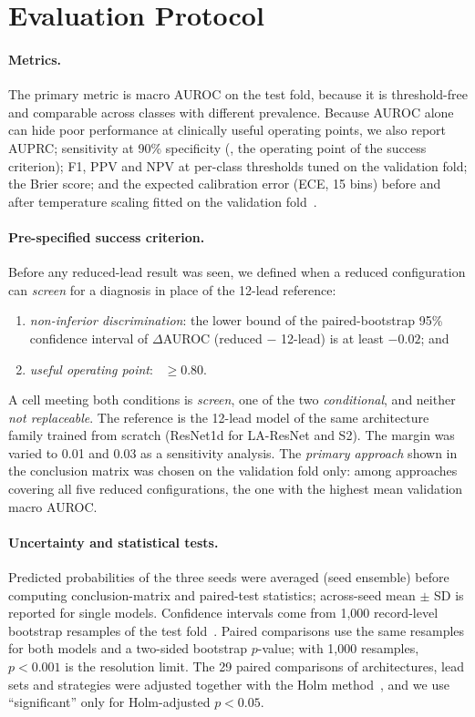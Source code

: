\section{Evaluation Protocol}
\label{sec:eval}

\paragraph{Metrics.} The primary metric is macro AUROC on the test fold, because it is threshold-free and comparable across classes with different prevalence. Because AUROC alone can hide poor performance at clinically useful operating points, we also report AUPRC; sensitivity at 90\% specificity (\sensninety, the operating point of the success criterion); F1, PPV and NPV at per-class thresholds tuned on the validation fold; the Brier score; and the expected calibration error (ECE, 15 bins) before and after temperature scaling fitted on the validation fold~\cite{guo2017calibration}.

\paragraph{Pre-specified success criterion.} Before any reduced-lead result was seen, we defined when a reduced configuration can \emph{screen} for a diagnosis in place of the 12-lead reference:
\begin{enumerate}
  \item \emph{non-inferior discrimination}: the lower bound of the paired-bootstrap 95\% confidence interval of $\Delta$AUROC (reduced $-$ 12-lead) is at least $-0.02$; and
  \item \emph{useful operating point}: \sensninety\ $\geq 0.80$.
\end{enumerate}
A cell meeting both conditions is \emph{screen}, one of the two \emph{conditional}, and neither \emph{not replaceable}. The reference is the 12-lead model of the same architecture family trained from scratch (ResNet1d for LA-ResNet and S2). The margin was varied to 0.01 and 0.03 as a sensitivity analysis. The \emph{primary approach} shown in the conclusion matrix was chosen on the validation fold only: among approaches covering all five reduced configurations, the one with the highest mean validation macro AUROC.

\paragraph{Uncertainty and statistical tests.} Predicted probabilities of the three seeds were averaged (seed ensemble) before computing conclusion-matrix and paired-test statistics; across-seed mean $\pm$ SD is reported for single models. Confidence intervals come from 1,000 record-level bootstrap resamples of the test fold~\cite{efron1993bootstrap}. Paired comparisons use the same resamples for both models and a two-sided bootstrap $p$-value; with 1,000 resamples, $p<0.001$ is the resolution limit. The 29 paired comparisons of architectures, lead sets and strategies were adjusted together with the Holm method~\cite{holm1979}, and we use ``significant'' only for Holm-adjusted $p<0.05$.

